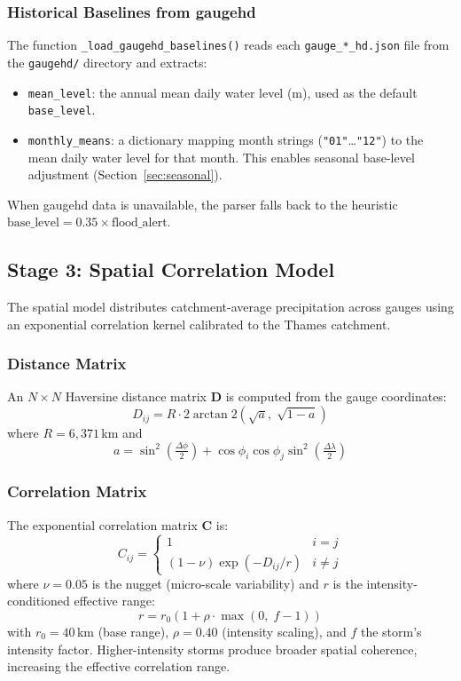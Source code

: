 \documentclass[11pt,a4paper]{article}
\begin{document}
\subsubsection{Historical Baselines from gaugehd}

The function \texttt{\_load\_gaugehd\_baselines()} reads each
\texttt{gauge\_*\_hd.json} file from the \texttt{gaugehd/} directory and
extracts:

\begin{itemize}[nosep]
    \item \texttt{mean\_level}: the annual mean daily water level (m), used as
          the default \texttt{base\_level}.
    \item \texttt{monthly\_means}: a dictionary mapping month strings
          (\texttt{"01"}\ldots\texttt{"12"}) to the mean daily water level for
          that month. This enables seasonal base-level adjustment (Section~\ref{sec:seasonal}).
\end{itemize}

\noindent When gaugehd data is unavailable, the parser falls back to the
heuristic $\text{base\_level} = 0.35 \times \text{flood\_alert}$.

\subsection{Stage 3: Spatial Correlation Model}
\label{sec:spatial}

The spatial model distributes catchment-average precipitation across gauges
using an exponential correlation kernel calibrated to the Thames catchment.

\subsubsection{Distance Matrix}

An $N \times N$ Haversine distance matrix $\mathbf{D}$ is computed from the
gauge coordinates:
\[
D_{ij} = R \cdot 2 \arctan2\!\left(\sqrt{a},\; \sqrt{1-a}\right)
\]
where $R = 6{,}371$\,km and
\[
a = \sin^2\!\left(\tfrac{\Delta\phi}{2}\right)
  + \cos\phi_i \cos\phi_j \sin^2\!\left(\tfrac{\Delta\lambda}{2}\right)
\]

\subsubsection{Correlation Matrix}

The exponential correlation matrix $\mathbf{C}$ is:
\[
C_{ij} = \begin{cases}
1 & i = j \\
(1 - \nu) \exp\!\left(-D_{ij} / r\right) & i \ne j
\end{cases}
\]
where $\nu = 0.05$ is the nugget (micro-scale variability) and $r$ is the
intensity-conditioned effective range:
\[
r = r_0 \left(1 + \rho \cdot \max(0,\; f - 1)\right)
\]
with $r_0 = 40$\,km (base range), $\rho = 0.40$ (intensity scaling), and
$f$ the storm's intensity factor. Higher-intensity storms produce broader
spatial coherence, increasing the effective correlation range.
\end{document}

